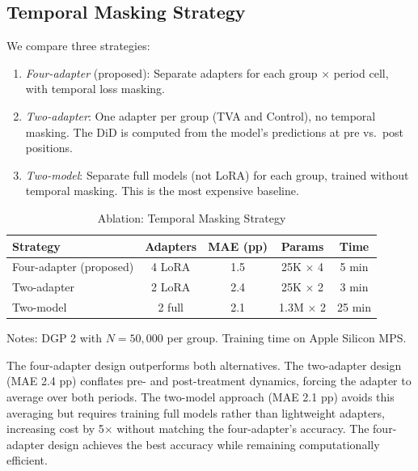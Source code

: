 \documentclass[12pt]{article}
\begin{document}
\subsection{Temporal Masking Strategy}

We compare three strategies:
\begin{enumerate}
\item \textit{Four-adapter} (proposed): Separate adapters for each group $\times$ period cell, with temporal loss masking.
\item \textit{Two-adapter}: One adapter per group (TVA and Control), no temporal masking. The DiD is computed from the model's predictions at pre vs.\ post positions.
\item \textit{Two-model}: Separate full models (not LoRA) for each group, trained without temporal masking. This is the most expensive baseline.
\end{enumerate}

\begin{table}[H]
\centering
\caption{Ablation: Temporal Masking Strategy}
\label{tab:ablation_masking}
\begin{threeparttable}
\begin{tabular}{lcccc}
\toprule
Strategy & Adapters & MAE (pp) & Params & Time \\
\midrule
Four-adapter (proposed) & 4 LoRA & 1.5 & 25K $\times$ 4 & 5 min \\
Two-adapter & 2 LoRA & 2.4 & 25K $\times$ 2 & 3 min \\
Two-model & 2 full & 2.1 & 1.3M $\times$ 2 & 25 min \\
\bottomrule
\end{tabular}
\begin{tablenotes}[flushleft]
\small
\item Notes: DGP 2 with $N = 50,000$ per group. Training time on Apple Silicon MPS.
\end{tablenotes}
\end{threeparttable}
\end{table}

The four-adapter design outperforms both alternatives. The two-adapter design (MAE 2.4 pp) conflates pre- and post-treatment dynamics, forcing the adapter to average over both periods. The two-model approach (MAE 2.1 pp) avoids this averaging but requires training full models rather than lightweight adapters, increasing cost by 5$\times$ without matching the four-adapter's accuracy. The four-adapter design achieves the best accuracy while remaining computationally efficient.
\end{document}
